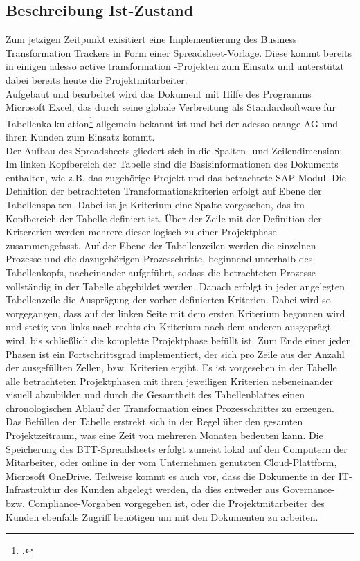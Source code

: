 \subsection{Beschreibung Ist-Zustand}
Zum jetzigen Zeitpunkt exisitiert eine Implementierung des Business Transformation Trackers in Form einer Spreadsheet-Vorlage. Diese kommt bereits in einigen adesso active transformation -Projekten zum Einsatz und unterstützt dabei bereits heute die Projektmitarbeiter.\\ Aufgebaut und bearbeitet wird das Dokument mit Hilfe des Programms Microsoft Excel, das durch seine globale Verbreitung als Standardsoftware für Tabellenkalkulation\footcite[Vgl.][]{wiki-excel} allgemein bekannt ist und bei der adesso orange AG und ihren Kunden zum Einsatz kommt.\\
Der Aufbau des Spreadsheets gliedert sich in die Spalten- und Zeilendimension: Im linken Kopfbereich der Tabelle sind die Basisinformationen des Dokuments enthalten, wie z.B. das zugehörige Projekt und das betrachtete SAP-Modul. Die Definition der betrachteten Transformationskriterien erfolgt auf Ebene der Tabellenspalten. Dabei ist je Kriterium eine Spalte vorgesehen, das im Kopfbereich der Tabelle definiert ist. Über der Zeile mit der Definition der Kritererien werden mehrere dieser logisch zu einer Projektphase zusammengefasst. Auf der Ebene der Tabellenzeilen werden die einzelnen Prozesse und die dazugehörigen Prozesschritte, beginnend unterhalb des Tabellenkopfs, nacheinander aufgeführt, sodass die betrachteten Prozesse vollständig in der Tabelle abgebildet werden. Danach erfolgt in jeder angelegten Tabellenzeile die Ausprägung der vorher definierten Kriterien. Dabei wird so vorgegangen, dass auf der linken Seite mit dem ersten Kriterium begonnen wird und stetig von links-nach-rechts ein Kriterium nach dem anderen ausgeprägt wird, bis schließlich die komplette Projektphase befüllt ist. Zum Ende einer jeden Phasen ist ein Fortschrittsgrad implementiert, der sich pro Zeile aus der Anzahl der ausgefüllten Zellen, bzw. Kriterien ergibt. Es ist vorgesehen in der Tabelle alle betrachteten Projektphasen mit ihren jeweiligen Kriterien nebeneinander visuell abzubilden und durch die Gesamtheit des Tabellenblattes einen chronologischen Ablauf der Transformation eines Prozesschrittes zu erzeugen.\\Das Befüllen der Tabelle erstrekt sich in der Regel über den gesamten Projektzeitraum, was eine Zeit von mehreren Monaten bedeuten kann. Die Speicherung des BTT-Spreadsheets erfolgt zumeist lokal auf den Computern der Mitarbeiter, oder online in der vom Unternehmen genutzten Cloud-Plattform, \glqq{}Microsoft OneDrive\grqq{}. Teilweise kommt es auch vor, dass die Dokumente in der IT-Infrastruktur des Kunden abgelegt werden, da dies entweder aus Governance- bzw. Compliance-Vorgaben vorgegeben ist, oder die Projektmitarbeiter des Kunden ebenfalls Zugriff benötigen um mit den Dokumenten zu arbeiten.


